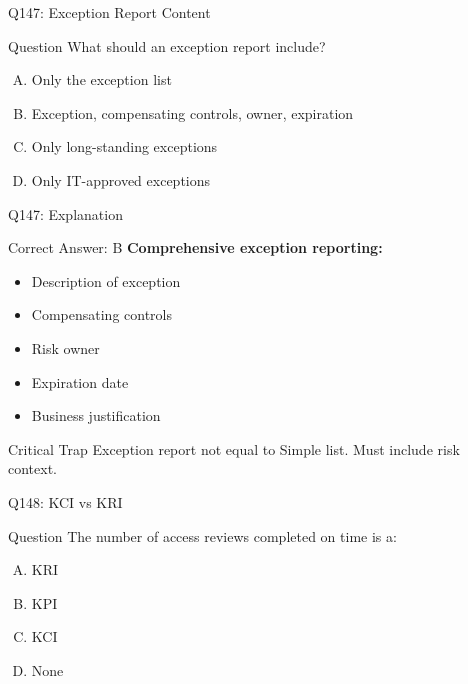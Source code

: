 \documentclass{beamer}
\begin{document}
	\begin{frame}{Q147: Exception Report Content}
		\begin{block}{Question}
			What should an exception report include?
		\end{block}
		\begin{enumerate}[(A)]
			\item Only the exception list
			\item Exception, compensating controls, owner, expiration
			\item Only long-standing exceptions
			\item Only IT-approved exceptions
		\end{enumerate}
	\end{frame}
	
	\begin{frame}{Q147: Explanation}
		\begin{block}{Correct Answer: B}
			\textbf{Comprehensive exception reporting:}
			\begin{itemize}
				\item Description of exception
				\item Compensating controls
				\item Risk owner
				\item Expiration date
				\item Business justification
			\end{itemize}
		\end{block}
		\begin{alertblock}{Critical Trap}
			Exception report not equal to Simple list.
			Must include risk context.
		\end{alertblock}
	\end{frame}
	
	\begin{frame}{Q148: KCI vs KRI}
		\begin{block}{Question}
			The number of access reviews completed on time is a:
		\end{block}
		\begin{enumerate}[(A)]
			\item KRI
			\item KPI
			\item KCI
			\item None
		\end{enumerate}
	\end{frame}
	
\end{document}
